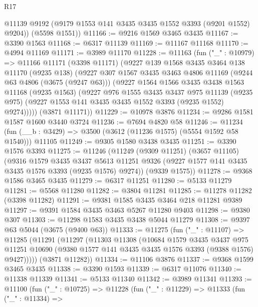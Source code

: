 \begin{lexlean}{R17}
\begin{coremodule}
        @11139
        @9192
        (@9179 @1553 @141 @3435 @3435 @1552 @3393 (@9201 @1552) @9204))
      (@5598 @1551))
@11166 := @9216 @1569 @3465 @3435
@11167 := @3390 @1563
@11168 := @6317 @11139
@11169 := @11167 @11168
@11170 := @4994 @11169
@11171 := @3989 @11170
@11228 := @11163
    (fun ("_" : @10979) =>
    @11166
      @11171
      (@3398 @11171)
      (@9227
        @139
        @1568
        @3435
        @3464
        @138
        @11170
        (@9235 @138)
        (@9227
          @307
          @1567
          @3435
          @3463
          @4806
          @11169
          (@9244 @63 @4806 (@3675 (@9247 @63)))
          (@9227
            @1564
            @1566
            @3435
            @3438
            @1563
            @11168
            (@9235 @1563)
            (@9227
              @976
              @1555
              @3435
              @3437
              @975
              @11139
              (@9235 @975)
              (@9227 @1553 @141 @3435 @3435 @1552 @3393 (@9235 @1552) @9274)))))
      (@3871 @11171))
@11229 := @10978 @3876
@11234 := @9286 @1581 @1587 @1600 @3440 @3724
@11236 := @7694 @4820 @58
@11246 := @11234 (fun (__b : @3429) => @3500 (@3612 (@11236 @1575) (@5554 @1592 @58 @1540))) @11105
@11249 := @9305 @1580 @3438 @3435
@11251 := @3390 @1576 @3393
@11275 := @11246
    (@11249
      (@9309 @11251)
      (@3657 @11105)
      (@9316
        @1579
        @3435
        @3437
        @5613
        @11251
        @9326
        (@9227 @1577 @141 @3435 @3435 @1576 @3393 (@9235 @1576) @9274))
      (@9339 @1575))
@11278 := @9368 @1586 @3465 @3435
@11279 := @6317 @11251
@11280 := @5133 @11279
@11281 := @5568 @11280
@11282 := @3804 @11281
@11285 := @11278 @11282 (@3398 @11282)
@11291 := @9381 @1585 @3435 @3464 @218 @11281 @9389
@11297 := @9391 @1584 @3435 @3463 @5267 @11280 @9403
@11298 := @9380 @307
@11303 := @11298 @1583 @3435 @3438 @5044 @11279
@11308 := @9397 @63 @5044 (@3675 (@9400 @63))
@11333 := @11275
    (fun ("_" : @11107) =>
    @11285
      (@11291
        (@11297
          (@11303
            @11308
            (@10684
              @1579
              @3435
              @3437
              @975
              @11251
              @10690
              (@9380 @1577 @141 @3435 @3435 @1576 @3393 (@9388 @1576) @9427)))))
      (@3871 @11282))
@11334 := @11106 @3876
@11337 := @9368 @1599 @3465 @3435
@11338 := @3390 @1593
@11339 := @6317 @11076
@11340 := @11338 @11339
@11341 := @5133 @11340
@11342 := @3989 @11341
@11393 := @11100
    (fun ("_" : @10725) =>
    @11228
      (fun ("_" : @11229) =>
      @11333
        (fun ("_" : @11334) =>

\end{coremodule}
\end{lexlean}
